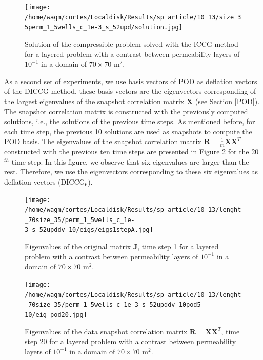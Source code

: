 \documentclass[12pt]{article}
\begin{document}
\begin{figure}[!h]
\centering
\begin{minipage}{.7\textwidth}
 \centering
\texttt{[image: /home/wagm/cortes/Localdisk/Results/sp\_article/10\_13/size\_35perm\_1\_5wells\_c\_1e-3\_s\_52upd/solution.jpg]}
\caption{Solution of the compressible problem solved with the ICCG method for a layered problem with a contrast between permeability layers of $10^{-1}$ in a domain of $70 \times 70$ m$^2$.}
\label{fig:compsol_1}
\end{minipage}
\end{figure}

As a second set of experiments, we use basis vectors of POD as deflation vectors of the DICCG method, these basis vectors are the eigenvectors corresponding of the largest eigenvalues of the snapshot correlation matrix $\mathbf{X}$ (see Section \ref{POD}). The snapshot correlation matrix is constructed with the previously computed solutions, i.e., the solutions of the previous time steps. As mentioned before, for each time step, the previous 10 solutions are used as snapshots to compute the POD basis. The eigenvalues of the snapshot correlation matrix $\mathbf{R}=\frac{1}{m}\mathbf{X}\mathbf{X}^T$ constructed with the previous ten time steps are presented in Figure \ref{fig:eig_POD_1} for the 20$^{th}$ time step. In this figure, we observe that six eigenvalues are larger than the rest. Therefore, we use the eigenvectors corresponding to these six eigenvalues as deflation vectors (DICCG$_6$). 
\begin{figure}[!h]
\centering
\begin{minipage}{.4\textwidth}
 \centering
 \vspace{-3mm}
\texttt{[image: /home/wagm/cortes/Localdisk/Results/sp\_article/10\_13/lenght\_70size\_35/perm\_1\_5wells\_c\_1e-3\_s\_52upddv\_10/eigs/eigs1stepA.jpg]}
 \vspace{-10pt}
\caption{Eigenvalues of the original matrix $\mathbf{J}$, time step 1 for a layered problem with a contrast between permeability layers of $10^{-1}$ in a domain of $70 \times 70$ m$^2$.}\label{fig:eigs_A_1}
\end{minipage}%
\hspace{1cm}
\begin{minipage}{.4\textwidth}
 \centering
\texttt{[image: /home/wagm/cortes/Localdisk/Results/sp\_article/10\_13/lenght\_70size\_35/perm\_1\_5wells\_c\_1e-3\_s\_52upddv\_10pod5-10/eig\_pod20.jpg]}
\vspace{-5mm}
\caption{Eigenvalues of the data snapshot correlation matrix $\mathbf{R}=\mathbf{X}\mathbf{X}^T$, time step 20 for a layered problem with a contrast between permeability layers of $10^{-1}$ in a domain of $70 \times 70$ m$^2$.}
\label{fig:eig_POD_1}
\end{minipage}
\end{figure}
\end{document}
